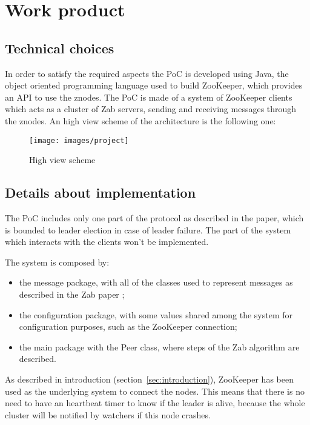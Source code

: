 \chapter{Work product\label{sec:work}}

\section{Technical choices\label{sec:technical}}
In order to satisfy the required aspects the PoC is developed using Java, the object oriented programming language used to build ZooKeeper, which provides an API to use the znodes.
The PoC is made of a system of ZooKeeper clients which acts as a cluster of Zab servers, sending and receiving messages through the znodes.
An high view scheme of the architecture is the following one:
\begin{figure}[H]
    \centering
    \texttt{[image: images/project]}
    \caption{High view scheme}
    \label{fig:scheme}
\end{figure}

\section{Details about implementation\label{sec:details}}

The PoC includes only one part of the protocol as described in the paper, which is bounded to leader election in case of leader failure. The part of the system which interacts with the clients won't be implemented.

The system is composed by:
\begin{itemize}
    \item the message package, with all of the classes used to represent messages as described in the Zab paper \cite{junqueira2011zab};
    \item the configuration package, with some values shared among the system for configuration purposes, such as the ZooKeeper connection;
    \item the main package with the Peer class, where steps of the Zab algorithm are described.
\end{itemize}

As described in introduction (section~\vref{sec:introduction}), ZooKeeper has been used as the underlying system to connect the nodes.
This means that there is no need to have an heartbeat timer to know if the leader is alive, because the whole cluster will be notified by watchers if this node crashes.

